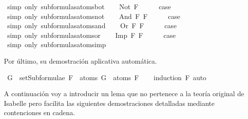\begin{isabellebody}
\ {\isacharparenleft}simp\ only{\isacharcolon}\ subformulas{\isacharunderscore}atoms{\isacharunderscore}bot{\isacharparenright}\isanewline
{}\isamarkupfalse%
\isanewline
\ \ \isamarkupfalse%
\ {\isacharparenleft}Not\ F{\isacharparenright}\isanewline
\ \ \isamarkupfalse%
\ \isamarkupfalse%
\ {\isacharquery}case\ \isamarkupfalse%
\ {\isacharparenleft}simp\ only{\isacharcolon}\ subformulas{\isacharunderscore}atoms{\isacharunderscore}not{\isacharparenright}\isanewline
{}\isamarkupfalse%
\isanewline
\ \ \isamarkupfalse%
\ {\isacharparenleft}And\ F{}\ F{}{\isacharparenright}\isanewline
\ \ \isamarkupfalse%
\ \isamarkupfalse%
\ {\isacharquery}case\ \isamarkupfalse%
\ {\isacharparenleft}simp\ only{\isacharcolon}\ subformulas{\isacharunderscore}atoms{\isacharunderscore}and{\isacharparenright}\isanewline
{}\isamarkupfalse%
\isanewline
\ \ \isamarkupfalse%
\ {\isacharparenleft}Or\ F{}\ F{}{\isacharparenright}\isanewline
\ \ \isamarkupfalse%
\ \isamarkupfalse%
\ {\isacharquery}case\ \isamarkupfalse%
\ {\isacharparenleft}simp\ only{\isacharcolon}\ subformulas{\isacharunderscore}atoms{\isacharunderscore}or{\isacharparenright}\isanewline
{}\isamarkupfalse%
\isanewline
\ \ \isamarkupfalse%
\ {\isacharparenleft}Imp\ F{}\ F{}{\isacharparenright}\isanewline
\ \ \isamarkupfalse%
\ \isamarkupfalse%
\ {\isacharquery}case\ \isamarkupfalse%
\ {\isacharparenleft}simp\ only{\isacharcolon}\ subformulas{\isacharunderscore}atoms{\isacharunderscore}imp{\isacharparenright}\isanewline
{}\isamarkupfalse%
%
\endisatagproof
{\isafoldproof}%
%
\isadelimproof
%
\endisadelimproof
%
\begin{isamarkuptext}%
Por último, su demostración aplicativa automática.%
\end{isamarkuptext}\isamarkuptrue%
\isamarkupfalse%
\ {\isachardoublequoteopen}G\ {\isasymin}\ setSubformulae\ F\ {\isasymLongrightarrow}\ atoms\ G\ {\isasymsubseteq}\ atoms\ F{\isachardoublequoteclose}\isanewline
%
\isadelimproof
\ \ %
\endisadelimproof
%
\isatagproof
{}\isamarkupfalse%
\ {\isacharparenleft}induction\ F{\isacharparenright}\ auto%
\endisatagproof
{\isafoldproof}%
%
\isadelimproof
%
\endisadelimproof
%
\begin{isamarkuptext}%
A continuación voy a introducir un lema que no pertenece a la 
  teoría original de Isabelle pero facilita las siguientes 
  demostraciones detalladas mediante contenciones en cadena.


\end{isamarkuptext}
\end{isabellebody}
